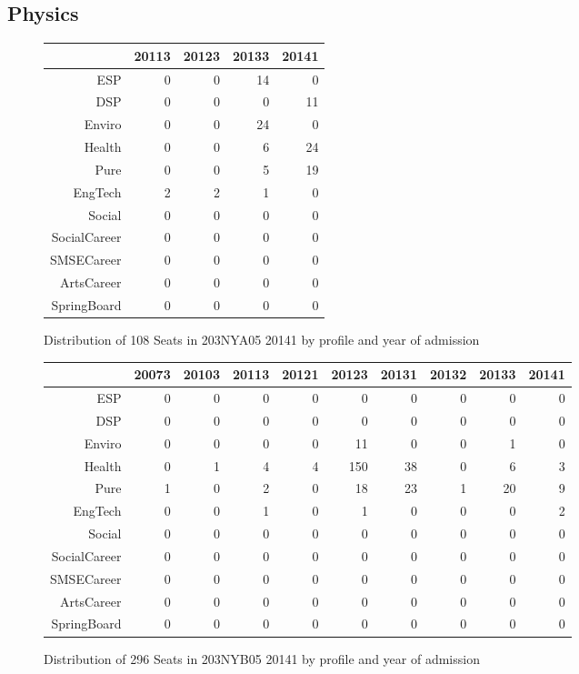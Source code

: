 \documentclass{article}\usepackage[]{graphicx}\usepackage[]{color}
\begin{document}
\subsection{Physics}
\begin{figure}[H]
\centering
\begin{tabular}{rrrrr}
  \hline
 & 20113 & 20123 & 20133 & 20141 \\ 
  \hline
ESP &   0 &   0 &  14 &   0 \\ 
  DSP &   0 &   0 &   0 &  11 \\ 
  Enviro &   0 &   0 &  24 &   0 \\ 
  Health &   0 &   0 &   6 &  24 \\ 
  Pure &   0 &   0 &   5 &  19 \\ 
  EngTech &   2 &   2 &   1 &   0 \\ 
  Social &   0 &   0 &   0 &   0 \\ 
  SocialCareer &   0 &   0 &   0 &   0 \\ 
  SMSECareer &   0 &   0 &   0 &   0 \\ 
  ArtsCareer &   0 &   0 &   0 &   0 \\ 
  SpringBoard &   0 &   0 &   0 &   0 \\ 
   \hline
\end{tabular}
\caption{Distribution of 108 Seats in 203NYA05 20141 by profile and year of admission} 
\end{figure}
\begin{figure}[H]
\centering
\begin{tabular}{rrrrrrrrrr}
  \hline
 & 20073 & 20103 & 20113 & 20121 & 20123 & 20131 & 20132 & 20133 & 20141 \\ 
  \hline
ESP &   0 &   0 &   0 &   0 &   0 &   0 &   0 &   0 &   0 \\ 
  DSP &   0 &   0 &   0 &   0 &   0 &   0 &   0 &   0 &   0 \\ 
  Enviro &   0 &   0 &   0 &   0 &  11 &   0 &   0 &   1 &   0 \\ 
  Health &   0 &   1 &   4 &   4 & 150 &  38 &   0 &   6 &   3 \\ 
  Pure &   1 &   0 &   2 &   0 &  18 &  23 &   1 &  20 &   9 \\ 
  EngTech &   0 &   0 &   1 &   0 &   1 &   0 &   0 &   0 &   2 \\ 
  Social &   0 &   0 &   0 &   0 &   0 &   0 &   0 &   0 &   0 \\ 
  SocialCareer &   0 &   0 &   0 &   0 &   0 &   0 &   0 &   0 &   0 \\ 
  SMSECareer &   0 &   0 &   0 &   0 &   0 &   0 &   0 &   0 &   0 \\ 
  ArtsCareer &   0 &   0 &   0 &   0 &   0 &   0 &   0 &   0 &   0 \\ 
  SpringBoard &   0 &   0 &   0 &   0 &   0 &   0 &   0 &   0 &   0 \\ 
   \hline
\end{tabular}
\caption{Distribution of 296 Seats in 203NYB05 20141 by profile and year of admission} 
\end{figure}
\end{document}

